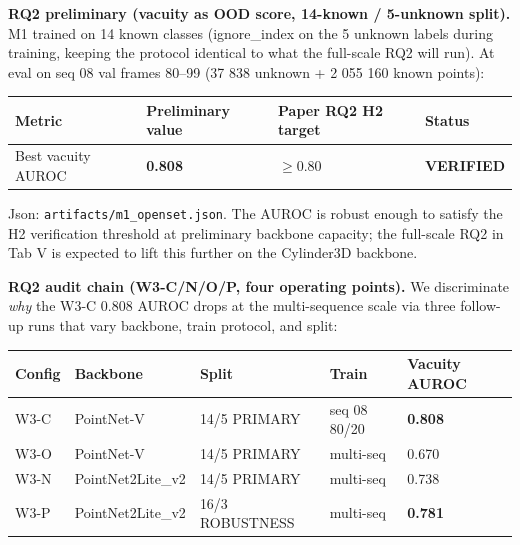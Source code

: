 \documentclass[
]{article}
\newcounter{none} %
\begin{document}
\textbf{RQ2 preliminary (vacuity as OOD score, 14-known / 5-unknown
split).} M1 trained on 14 known classes (ignore\_index on the 5 unknown
labels during training, keeping the protocol identical to what the
full-scale RQ2 will run). At eval on seq 08 val frames 80--99 (37 838
unknown + 2 055 160 known points):

{\def\LTcaptype{none} %
\begin{longtable}[]{@{}llll@{}}
\toprule\noalign{}
Metric & Preliminary value & Paper RQ2 H2 target & Status \\
\midrule\noalign{}
\endhead
\bottomrule\noalign{}
\endlastfoot
Best vacuity AUROC & \textbf{0.808} & \(\ge 0.80\) &
\textbf{VERIFIED} \\
\end{longtable}
}

Json: \texttt{artifacts/m1\_openset.json}. The AUROC is robust enough to
satisfy the H2 verification threshold at preliminary backbone capacity;
the full-scale RQ2 in Tab V is expected to lift this further on the
Cylinder3D backbone.

\textbf{RQ2 audit chain (W3-C/N/O/P, four operating points).} We
discriminate \emph{why} the W3-C 0.808 AUROC drops at the multi-sequence
scale via three follow-up runs that vary backbone, train protocol, and
split:

{\def\LTcaptype{none} %
\begin{longtable}[]{@{}lllll@{}}
\toprule\noalign{}
Config & Backbone & Split & Train & Vacuity AUROC \\
\midrule\noalign{}
\endhead
\bottomrule\noalign{}
\endlastfoot
W3-C & PointNet-V & 14/5 PRIMARY & seq 08 80/20 & \textbf{0.808} \\
W3-O & PointNet-V & 14/5 PRIMARY & multi-seq & 0.670 \\
W3-N & PointNet2Lite\_v2 & 14/5 PRIMARY & multi-seq & 0.738 \\
W3-P & PointNet2Lite\_v2 & 16/3 ROBUSTNESS & multi-seq &
\textbf{0.781} \\
\end{longtable}
}
\end{document}
